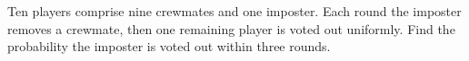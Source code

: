 Ten players comprise nine crewmates and one imposter. Each round the imposter removes a crewmate, then one remaining player is voted out uniformly. Find the probability the imposter is voted out within three rounds.
